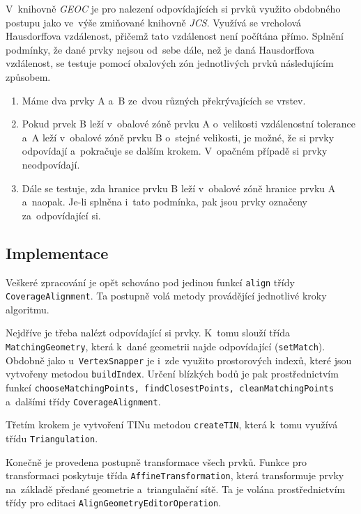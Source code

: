 V~knihovně \textit{GEOC} je pro nalezení odpovídajících si prvků využito 
obdobného postupu jako ve~výše zmiňované knihovně \textit{JCS}. Využívá 
se vrcholová Hausdorffova vzdálenost, přičemž tato vzdálenost není počítána 
přímo. Splnění podmínky, že dané prvky nejsou od~sebe dále, než je daná 
Hausdorffova vzdálenost, se testuje pomocí obalových zón jednotlivých prvků 
následujícím způsobem.

\begin{enumerate}
 \item Máme dva prvky A a~B ze~dvou různých překrývajících se vrstev.
 \item Pokud prvek B leží v~obalové zóně prvku A o~velikosti vzdálenostní 
    tolerance a~A leží v~obalové zóně prvku B o~stejné velikosti, je možné, 
    že si prvky odpovídají a~pokračuje se dalším krokem. V~opačném případě 
    si prvky neodpovídají.
 \item Dále se testuje, zda hranice prvku B leží v~obalové zóně hranice prvku
    A a~naopak. Je-li splněna i~tato podmínka, pak jsou prvky označeny 
    za~odpovídající si.
\end{enumerate}


\subsection{Implementace} %
\label{ca-implementace}
Veškeré zpracování je opět schováno pod jedinou funkcí \texttt{align} třídy
\texttt{Coverage\-Alignment}. Ta postupně volá metody provádějící jednotlivé
kroky algoritmu.

Nejdříve je třeba nalézt odpovídající si prvky. K~tomu slouží třída 
\texttt{Matching\-Geometry}, která k~dané geometrii najde odpovídající
(\texttt{set\-Match}). Obdobně jako u~\texttt{Vertex\-Snapper} je i~zde 
využito prostorových indexů, které jsou vytvořeny metodou 
\texttt{build\-Index}. Určení blízkých bodů je pak prostřednictvím
funkcí \texttt{choose\-Matching\-Points, \-find\-Closest\-Points,
\-clean\-Matching\-Points} a~dalšími třídy \texttt{Co\-ve\-ra\-ge\-Align\-ment}.

Třetím krokem je vytvoření TINu metodou \texttt{create\-TIN}, která k~tomu
využívá třídu \texttt{Tri\-an\-gu\-la\-tion}.  

Konečně je provedena postupně transformace všech prvků. Funkce pro
transformaci poskytuje třída \texttt{Affine\-Trans\-for\-mation},
která transformuje prvky na~základě předané geometrie a~triangulační
sítě. Ta je volána prostřednictvím třídy pro editaci 
\texttt{Align\-Geo\-metry\-Edi\-tor\-Ope\-ra\-tion}.


